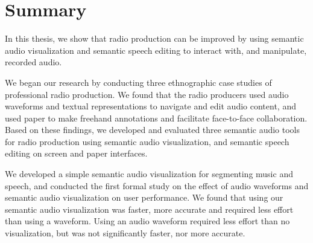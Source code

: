 \clearpage
\section{Summary}\label{sec:conclusions-conclusions}





In this thesis, we show that radio production can be improved by using semantic audio visualization and semantic
speech editing to interact with, and manipulate, recorded audio.

We began our research by conducting three ethnographic case studies of professional radio production. We found that
the radio producers used audio waveforms and textual representations to navigate and edit audio content, and used paper
to make freehand annotations and facilitate face-to-face collaboration.  Based on these findings, we developed and
evaluated three semantic audio tools for radio production using semantic audio visualization, and semantic speech
editing on screen and paper interfaces.

We developed a simple semantic audio visualization for segmenting music and speech, and conducted the first formal
study on the effect of audio waveforms and semantic audio visualization on user performance. We found that using our
semantic audio visualization was faster, more accurate and required less effort than using a waveform.  Using an audio
waveform required less effort than no visualization, but was not significantly faster, nor more accurate.

